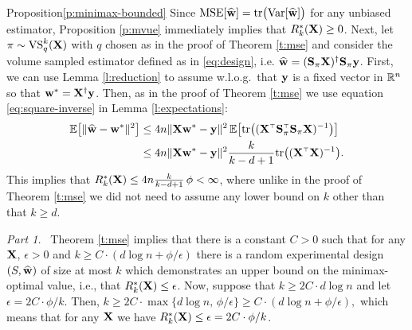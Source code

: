 \documentclass[12pt]{sty/colt2019/colt2018-arxiv}
\begin{document}
\begin{proofof}{Proposition}{\ref{p:minimax-bounded}} 
  Since $\mathrm{MSE}[\widehat{\mathbf w}]=\mathrm{tr}\big(\mathrm{Var}[\widehat{\mathbf w}]\big)$
for any unbiased estimator, Proposition
\ref{p:mvue} immediately implies that $R_k^*(\mathbf X)\geq 0$. Next,
let $\pi\sim{\mathrm{VS}}_q^k(\mathbf X)$ with $q$ chosen as in the proof of Theorem
\ref{t:mse} and consider the volume sampled estimator defined as in
\eqref{eq:design}, i.e. $\widehat{\mathbf w}=(\mathbf{S}_\pi\mathbf X)^\dagger\mathbf{S}_\pi\mathbf y$. First, we
can use Lemma \ref{l:reduction} to assume w.l.o.g.~that $\mathbf y$ is a
fixed vector in $\mathbb R^n$ so that $\mathbf w^*=\mathbf X^\dagger\mathbf y$. Then, as in
the proof of Theorem \ref{t:mse} we use equation \eqref{eq:square-inverse} in Lemma
\ref{l:expectations}:
\begin{align*}
  \E\big[\|\wbh-\w^*\|^2\big]&\leq
  4n\|\X\w^*-\y\|^2\,\E\big[\tr\big((\X^\top\S_\pi^\top\S_\pi\X)^{-1}\big)\big]\\
  &\leq 4n\|\X\w^*-\y\|^2\frac{k}{k-d+1}\tr\big((\X^\top\X)^{-1}\big).
\end{align*}
This implies that $R_k^*(\mathbf X)\leq 4n\frac{k}{k-d+1}\,\phi<\infty$, 
where unlike in the proof of Theorem \ref{t:mse} we did not need to
assume any lower bound on $k$ other than that $k\geq d$.

\textit{Part 1.} \
Theorem \ref{t:mse} implies that there is a constant $C>0$ such that
for any $\mathbf X$, $\epsilon>0$ and $k\geq C\cdot (d\log n+\phi/\epsilon)$ there
is a random experimental design $(S,\widehat{\mathbf w})$ of size at most $k$ which
demonstrates an upper bound on the minimax-optimal value, i.e., that
$R_k^*(\mathbf X)\leq \epsilon$. Now, suppose that $k\geq 2C\cdot d\log n$ and
let $\epsilon=2C\cdot\phi/k$. Then,
$
  k\geq 2C\cdot \max\{d\log n,\,\phi/\epsilon\}\geq C\cdot(d\log n + \phi/\epsilon),
$
which means that for any $\mathbf X$ we have $R_k^*(\mathbf X)\leq \epsilon=2C\cdot\phi/k$.


\end{proofof}
\end{document}
